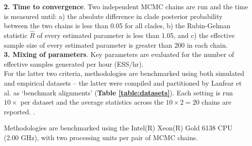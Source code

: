 \documentclass[10pt,letterpaper]{article}
\begin{document}
\textbf{2. Time to convergence}. Two independent MCMC chains are run and the time is measured until: a) the absolute difference in clade posterior probability between the two chains is less than 0.05 for all clades, b) the Rubin-Gelman statistic $\hat{R}$ \cite{gelman1992inference} of every estimated parameter is less than 1.05, and c) the effective sample size \cite{rambaut2018posterior} of every estimated parameter is greater than 200 in each chain. \\

\textbf{3. Mixing of parameters}. Key parameters are evaluated for the number of effective samples generated per hour (ESS/hr). \\


For the latter two criteria, methodologies are benchmarked using both simulated and empirical datasets -- the latter were compiled \cite{lanfear2019Github} and partitioned \cite{lanfear2016partitionfinder} by Lanfear et al. as `benchmark alignments' (\textbf{Table \ref{table:datasets}}). Each setting is run $10 \times$ per dataset and the average statistics across the $10 \times 2 = 20$ chains are reported. .



Methodologies are benchmarked using the Intel(R) Xeon(R) Gold 6138 CPU (2.00 GHz), with two processing units per pair of MCMC chains.
\end{document}
